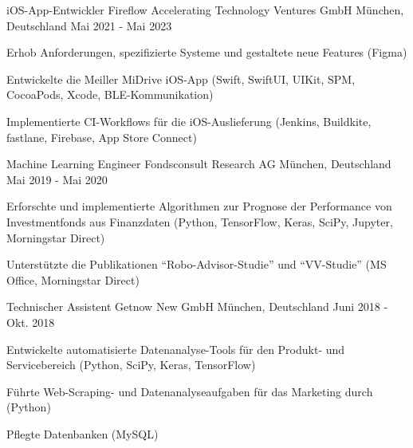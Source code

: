 \begin{cventries}

\cventry
{iOS-App-Entwickler} %
{Fireflow Accelerating Technology Ventures GmbH} %
{München, Deutschland} %
{Mai 2021 - Mai 2023} %
{ %
\begin{cvitems}
\item {Erhob Anforderungen, spezifizierte Systeme und gestaltete neue Features (Figma)}
\item {Entwickelte die Meiller MiDrive iOS-App (Swift, SwiftUI, UIKit, SPM, CocoaPods, Xcode, BLE-Kommunikation)}
\item {Implementierte CI-Workflows für die iOS-Auslieferung (Jenkins, Buildkite, fastlane, Firebase, App Store Connect)}
\end{cvitems}
}


\cventry
{Machine Learning Engineer} %
{Fondsconsult Research AG} %
{München, Deutschland} %
{Mai 2019 - Mai 2020} %
{ %
\begin{cvitems}
\item {Erforschte und implementierte Algorithmen zur Prognose der Performance von Investmentfonds aus Finanzdaten (Python, TensorFlow, Keras, SciPy, Jupyter, Morningstar Direct)}
\item {Unterstützte die Publikationen ``Robo-Advisor-Studie'' und ``VV-Studie'' (MS Office, Morningstar Direct)}
\end{cvitems}
}


\cventry
{Technischer Assistent} %
{Getnow New GmbH} %
{München, Deutschland} %
{Juni 2018 - Okt. 2018} %
{ %
\begin{cvitems}
\item {Entwickelte automatisierte Datenanalyse-Tools für den Produkt- und Servicebereich (Python, SciPy, Keras, TensorFlow)}
\item {Führte Web-Scraping- und Datenanalyseaufgaben für das Marketing durch (Python)}
\item {Pflegte Datenbanken (MySQL)}
\end{cvitems}
}

\end{cventries}
